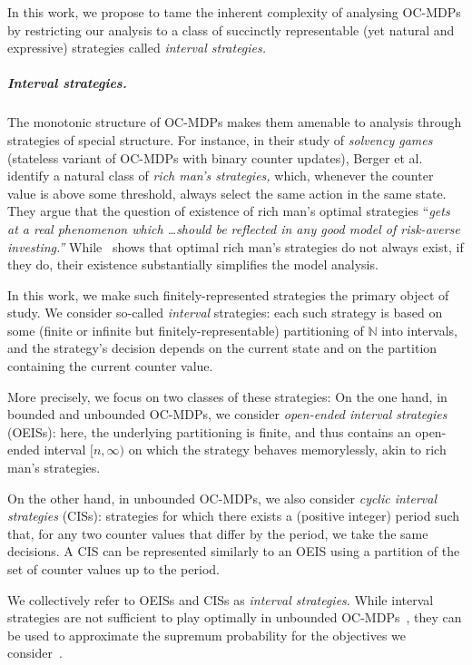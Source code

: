 \documentclass[a4paper,UKenglish,cleveref,autoref,thm-restate,colorlinks]{lipics-v2021}
\begin{document}
In this work, we propose to tame the inherent complexity of analysing OC-MDPs by restricting our analysis to a class of succinctly representable (yet natural and expressive) strategies called \emph{interval strategies.}

\subparagraph*{Interval strategies.}
The monotonic structure of OC-MDPs makes them amenable to analysis through strategies of special structure. For instance, in their study of \emph{solvency games} (stateless variant of OC-MDPs with binary counter updates), Berger et al.~\cite{DBLP:conf/fsttcs/BergerKSV08} identify a natural class of \emph{rich man's strategies,} which, whenever the counter value is above some threshold, always select the same action in the same state. They argue that the question of existence of rich man's optimal strategies ``\emph{gets at a real phenomenon which \dots should be reflected in any good model of risk-averse investing.''} While~\cite{DBLP:conf/fsttcs/BergerKSV08} shows that optimal rich man's strategies do not always exist, if they do, their existence substantially simplifies the model analysis.

In this work, we make such finitely-represented strategies the primary object of study. We consider so-called \emph{interval} strategies: each such strategy is based on some (finite or infinite but finitely-representable) partitioning of \( \mathbb{N} \) into intervals, and the strategy's decision depends on the current state and on the partition containing the current counter value.


More precisely,
we focus on two classes of these strategies:
On the one hand, in bounded and unbounded OC-MDPs, we consider \textit{open-ended interval strategies} (OEISs): here, the underlying partitioning is finite, and thus contains an open-ended interval \( [n,\infty) \) on which the strategy behaves memorylessly, akin to rich man's strategies.


On the other hand, in unbounded OC-MDPs, we also consider \textit{cyclic interval strategies} (CISs): strategies for which there exists a (positive integer) period such that, for any two counter values that differ by the period, we take the same decisions.
A CIS can be represented similarly to an OEIS using a partition of the set of counter values up to the period.

We collectively refer to OEISs and CISs as \textit{interval strategies}.
While interval strategies are not sufficient to play optimally in unbounded OC-MDPs~\cite{DBLP:conf/fsttcs/BergerKSV08}, they can be used to approximate the supremum probability for the objectives we consider~\cite{DBLP:journals/iandc/BrazdilBEK13}. 
\end{document}
